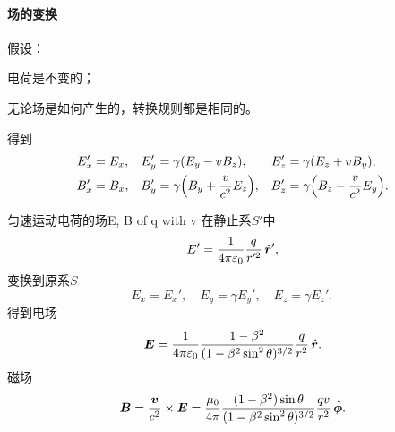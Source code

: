 \paragraph{场的变换}
假设：
\begin{compactenum}
	\item 电荷是不变的；
	\item 无论场是如何产生的，转换规则都是相同的。
\end{compactenum}
得到
\begin{align}
    E_x'&=E_x,&E_y'&=\gamma(E_y-vB_z),&E_z'&=\gamma(E_z+vB_y);\\
    B_x'&=B_x,&B_y'&=\gamma\Bigl(B_y+\frac v{c^2}E_z\Bigr),&B_z'&=\gamma\Bigl(B_z-\frac v{c^2}E_y\Bigr).
\end{align}
\begin{example}{匀速运动电荷的场}{E, B of q with v}
    在静止系$S'$中
    \[
        E'=\frac1{4\pi\varepsilon_0}\frac q{r'^2}\mathop{}\!\hat{\bm r}',
    \]
    变换到原系$S$
    \[
        E_x=E_x',\quad E_y=\gamma E_y',\quad E_z=\gamma E_z',
    \]
    得到电场 
    \begin{equation}
        \bm E=\frac1{4\pi\varepsilon_0}\frac{1-\beta^2}{(1-\beta^2\sin^2\theta)^{3/2}}\frac q{r^2}\mathop{}\!\hat{\bm r}.
    \end{equation}
    磁场 
    \begin{equation}
        \bm B=\frac{\bm v}{c^2}\times\bm E=\frac{\mu_0}{4\pi}\frac{(1-\beta^2)\sin\theta}{(1-\beta^2\sin^2\theta)^{3/2}}\frac{qv}{r^2}\mathop{}\!\hat{\bm \phi}.
    \end{equation}
\end{example}

